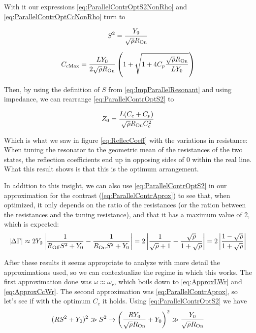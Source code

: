 \documentclass[../main.tex]{subfiles}
\begin{document}
With it our expressions \ref{eq:ParallelContrOptS2NonRho} and
\ref{eq:ParallelContrOptCcNonRho} turn to

\begin{equation}
\label{eq:ParallelContrOptS2}
    S^2 = \frac{Y_{0}}{\sqrt{\rho}R_{\text{On}}}
\end{equation}

\begin{equation*}
\label{eq:ParallelContrOptCc}
C_{c\text{Max}} = \frac{L Y_{0}}{2\sqrt{\rho}R_{\text{On}}}
\left(1 + \sqrt{1 + 4C_{p}\frac{\sqrt{\rho}R_{\text{On}}}{LY_{0}}}\right)
\end{equation*}

Then, by using the definition of \(S\) from \ref{eq:ImpParallelResonant} and
using impedance, we can rearrange \ref{eq:ParallelContrOptS2} to

\begin{equation*}
\label{eq:ParallelTunning}
Z_{0} = \frac{L(C_{c}+C_{p})}{\sqrt{\rho}R_{\text{On}} C_{c}^2}
\end{equation*}

Which is what we saw in figure \ref{eq:ReflecCoeff} with the
variations in resistance: When tuning the resonator to the geometric mean of
the resistances of the two states, the reflection coefficients end up in
opposing sides of 0 within the real line. What this result shows is that
this is the optimum arrangement.

In addition to this insight, we can also use \ref{eq:ParallelContrOptS2} in
our approximation for the contrast (\ref{eq:ParallelContrAprox}) to see
that, when optimized, it only depends on the ratio of the resistances
(or the ration between the resistances and the
tuning resistance), and that it has a maximum value of 2, which is expected:
\begin{equation}
\label{eq:OptimumParallelContr}
    |\Delta\Gamma| \approx 2Y_{0}\left|\frac{1}{
                   R_{\text{Off}} S^2 + Y_{0}} - \frac{1}{R_{\text{On}} S^2 + Y_{0}
               }\right|
                   = 2\left|
                   \frac{1}{\sqrt\rho + 1} - \frac{\sqrt\rho}{1 + \sqrt\rho}
                   \right|
                   = 2\left|
                   \frac{1 - \sqrt\rho}{1 + \sqrt\rho}
                   \right|
\end{equation}

After these results it seems appropriate to analyze with more detail the
approximations used, so we can contextualize the regime in which this works.
The first approximation done was \(\omega \approx \omega_{r}\), which boils
down to \ref{eq:ApproxLWr} and \ref{eq:ApproxCcWr}. The second approximation
was \ref{eq:ParallelContrAprox}, so let's see if with the optimum \(C_{c}\) it
holds. Using \ref{eq:ParallelContrOptS2} we have
\begin{equation*}
    (RS^2 + Y_{0})^2 \gg S^2 \rightarrow
    \left(\frac{R Y_{0}}{\sqrt\rho R_{\text{On}}} + Y_{0}\right)^2 \gg
    \frac{Y_{0}}{\sqrt\rho R_{\text{On}}}
\end{equation*}
\end{document}
